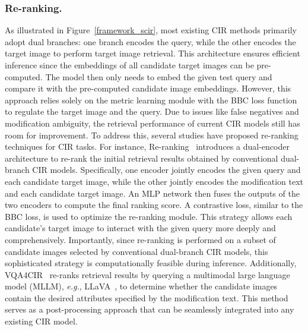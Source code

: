 \subsubsection{Re-ranking.}
As illustrated in Figure~\ref{framework_scir}, most existing CIR methods primarily adopt dual branches: one branch encodes the query, while the other encodes the target image to perform target image retrieval. This architecture ensures efficient inference since the embeddings of all candidate target images can be pre-computed. The model then only needs to embed the given test query and compare it with the pre-computed candidate image embeddings.
However, this approach relies solely on the metric learning module with the BBC loss function to regulate the target image and the query. Due to issues like false negatives and modification ambiguity, the retrieval performance of current CIR models still has room for improvement. To address this, several studies have proposed re-ranking techniques for CIR tasks.
For instance, Re-ranking~\cite{liu2023rerank} introduces a dual-encoder architecture to re-rank the initial retrieval results obtained by conventional dual-branch CIR models. Specifically, one encoder jointly encodes the given query and each candidate target image, while the other jointly encodes the modification text and each candidate target image. An MLP network then fuses the outputs of the two encoders to compute the final ranking score. A contrastive loss, similar to the BBC loss, is used to optimize the re-ranking module. This strategy allows each candidate's target image to interact with the given query more deeply and comprehensively. Importantly, since re-ranking is performed on a subset of candidate images selected by conventional dual-branch CIR models, this sophisticated strategy is computationally feasible during inference.
Additionally, VQA4CIR~\cite{feng2023vqa4cir} re-ranks retrieval results by querying a multimodal large language model (MLLM), \textit{e.g.}, LLaVA~\cite{liu2024visual}, to determine whether the candidate images contain the desired attributes specified by the modification text. This method serves as a post-processing approach that can be seamlessly integrated into any existing CIR model.

